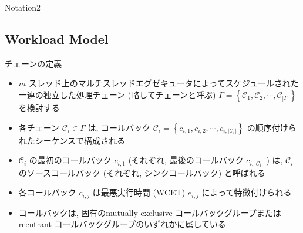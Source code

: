 \begin{frame}{Notation2}
    \begin{table}[tb]
    \end{table}
\end{frame}

\subsection{Workload Model}
\label{ssec: workload_model}

\begin{frame}{チェーンの定義}

    \begin{itemize}
        \item $m$ スレッド上のマルチスレッドエグゼキュータによってスケジュールされた一連の独立した処理チェーン (略してチェーンと呼ぶ) $\Gamma=\left\{\mathcal{C}_{1}, \mathcal{C}_{2}, \cdots, \mathcal{C}_{|\Gamma|}\right\}$ を検討する


        \item 各チェーン $\mathcal{C}_{i} \in \Gamma$ は, コールバック $\mathcal{C}_{i}=\left\{c_{i, 1}, c_{i, 2}, \cdots, c_{i,\left|\mathcal{C}_{i}\right|}\right\}$ の順序付けられたシーケンスで構成される
        \item $\mathcal{C}_{i}$ の最初のコールバック $c_{i, 1}$ (それぞれ, 最後のコールバック $c_{i,\left|\mathcal{C}_{i}\right|}$ ) は, $\mathcal{C}_{i}$ のソースコールバック (それぞれ, シンクコールバック) と呼ばれる
    \end{itemize}
\end{frame}

\begin{frame}{}
    \begin{itemize}
        \item 各コールバック $c_{i, j}$ は最悪実行時間 (WCET) $e_{i, j}$ によって特徴付けられる
        \item コールバックは, 固有のmutually exclusive コールバックグループまたはreentrant コールバックグループのいずれかに属している
    \end{itemize}
\end{frame}

